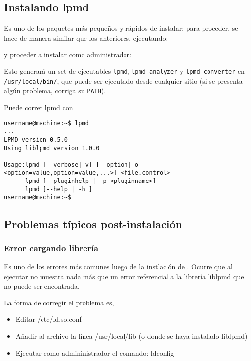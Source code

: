 \subsection{Instalando lpmd}

Es uno de los paquetes m\'as peque\~nos y r\'apidos de instalar; para proceder, se hace de manera similar que los anteriores, ejecutando:


y proceder a instalar como administrador:


Esto generar\'a un set de ejecutables \verb|lpmd|, \verb|lpmd-analyzer| y \verb|lpmd-converter| en \verb|/usr/local/bin/|, que puede ser ejecutado desde cualquier sitio (si se presenta alg\'un problema, corriga su \verb|PATH|).

Puede correr lpmd con

\begin{verbatim}
username@machine:~$ lpmd
...
LPMD version 0.5.0
Using liblpmd version 1.0.0

Usage:lpmd [--verbose|-v] [--option|-o <option=value,option=value,...>] <file.control>
      lpmd [--pluginhelp | -p <pluginname>]
      lpmd [--help | -h ]
username@machine:~$
\end{verbatim}

\subsection{Problemas t\'ipicos post-instalaci\'on}

\subsubsection{Error cargando librer\'ia}

Es uno de los errores m\'as comunes luego de la instlaci\'on de \lpmd. Ocurre que al ejecutar \lpmd no muestra nada m\'as que un error referencial a la librer\'ia liblpmd que no puede ser encontrada.

La forma de corregir el problema es,

\begin{itemize}
 \item Editar /etc/ld.so.conf
 \item A\~nadir al archivo la l\'inea /usr/local/lib (o donde se haya instalado liblpmd)
 \item Ejecutar como admininistrador el comando: ldconfig
\end{itemize}

